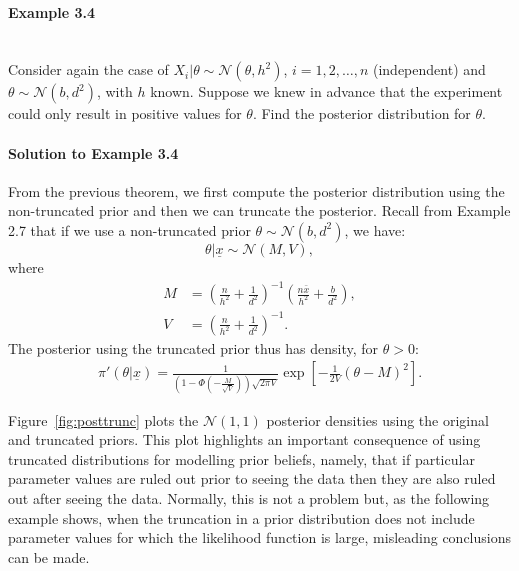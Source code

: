 \paragraph{Example 3.4}{~\\
Consider again the case of $X_i|\theta\sim \mathcal{N}(\theta,h^2)$, $i=1,2,\ldots,n$
(independent) and $\theta\sim \mathcal{N}(b,d^2)$, with $h$ known.
Suppose we knew in advance that the experiment could only result in positive values for $\theta$.
Find the posterior distribution for $\theta$.

\paragraph{Solution to Example 3.4}{
    
    From the previous theorem, we first compute the posterior distribution using the non-truncated prior and then we can truncate the posterior. Recall from Example 2.7 that if we use a non-truncated prior $\theta \sim\mathcal{N}(b,d^2)$, we have:
    $$ \theta | \underline{x} \sim \mathcal{N}(M, V), $$
    where
    \begin{align*}
        M &= \left(\frac{n}{h^2} + \frac{1}{d^2}\right)^{-1}\left(\frac{n\bar{x}}{h^2} + \frac{b}{d^2}\right), \\
        V &= \left(\frac{n}{h^2} + \frac{1}{d^2}\right)^{-1}.
    \end{align*}
    The posterior using the truncated prior thus has density, for $\theta > 0$:
    \begin{align*}
        \pi'(\theta | \underline{x}) = \frac{1}{\left(1 - \Phi\left(-\frac{M}{\sqrt{V}}\right)\right) \sqrt{2\pi V}}\exp\left[-\frac{1}{2V}(\theta - M)^2\right].
    \end{align*} 
    
    
    
}

Figure~\ref{fig:posttrunc} plots the $\mathcal{N}(1,1)$ posterior densities
using the original and truncated priors.
This plot highlights an important consequence of using truncated
distributions for modelling prior beliefs, namely, that if particular
parameter values are ruled out prior to seeing the data then they are
also ruled out after seeing the data. Normally, this is not a problem
but, as the following example shows, when the truncation in a prior
distribution does not include parameter values for which the
likelihood function is large, misleading conclusions can be made.

\begin{figure}[h!]


\end{figure}}
